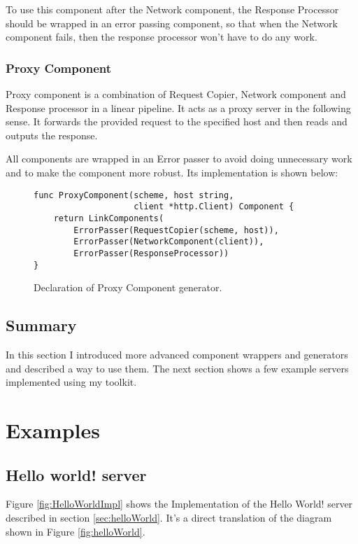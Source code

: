 \documentclass[12pt,a4paper]{article}
\begin{document}
To use this component after the Network component, the Response Processor
should be wrapped in an error passing component, so that when the 
Network component fails, then the response processor won't have to do
any work.

\subsubsection{Proxy Component}
Proxy component is a combination of Request Copier, Network component 
and Response processor in a linear pipeline. It acts as a proxy server
in the following sense. It forwards the provided request to the specified
host and then reads and outputs the response. 

All components are wrapped
in an Error passer to avoid doing unnecessary work and to make the component
more robust. Its implementation is shown below:

\begin{figure}[h]
\centering
\begin{lstlisting}
func ProxyComponent(scheme, host string, 
					client *http.Client) Component {
	return LinkComponents(
		ErrorPasser(RequestCopier(scheme, host)),
		ErrorPasser(NetworkComponent(client)),
		ErrorPasser(ResponseProcessor))
}
\end{lstlisting}
\caption[scale=1.0]{Declaration of Proxy Component generator.}
\label{fig:ProxyComp}
\end{figure}

\subsection{Summary}
In this section I introduced more advanced component wrappers and generators
and described a way to use them. The next section shows a few example
servers implemented using my toolkit.


\newpage
\section{Examples}
\label{sec:examples}
\subsection{Hello world! server}
Figure \ref{fig:HelloWorldImpl} shows the Implementation of the Hello World!
server described in section \ref{sec:helloWorld}.
It's a direct translation of the diagram shown in Figure \ref{fig:helloWorld}.
\end{document}
